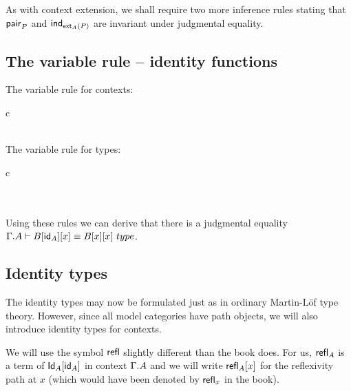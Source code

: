 As with context extension, we shall require two more inference rules stating that
$\mathsf{pair}_P$ and $\mathsf{ind}_{\mathsf{ext}_A(P)}$ are invariant under judgmental equality.

\subsection{The variable rule -- identity functions}
The variable rule for contexts:
\begin{infarray}{c}
\inference{\jctx{\Gamma}}{\jtermt{\Gamma}{\ctxwk{\Gamma}{\Gamma}}{\idfunc[\Gamma]}}\\
\\
\end{infarray}


The variable rule for types:
\begin{infarray}{c}
\\
\\
\\
\end{infarray}

Using these rules we can derive that there is a judgmental equality $\jtypeeq{\ctxext{\Gamma}{A}}{\subst{x}{{\idfunc[A]}{B}}}
{\subst{x}{{x}{B}}}$.

\subsection{Identity types}
The identity types may now be formulated just as in ordinary Martin\nobreakdash-L\"of
type theory. However, since all model categories have path objects, we will also
introduce identity types for contexts.

We will use the symbol ${\mathsf{refl}}$ slightly different than the book does. For us,
$\mathsf{refl}_{A}$ is a term of $\subst{\idfunc[A]}{\idtypevar{A}}$ in context
$\ctxext{\Gamma}{A}$ and we will write $\subst{x}{\refl{A}}$ for the reflexivity
path at $x$ (which would have been denoted by $\mathsf{refl}_{x}$ in the book).

